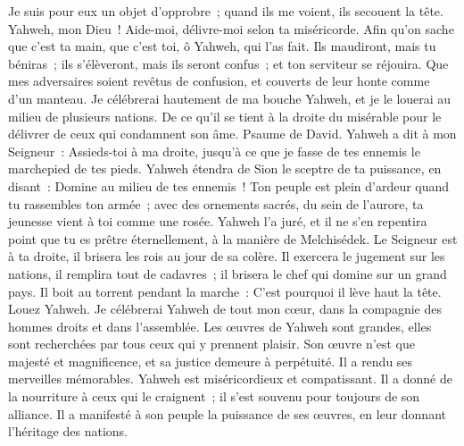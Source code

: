 \begin{multicols}{2}
Je suis pour eux un objet d'opprobre~; quand ils me voient, ils secouent la tête.
Yahweh, mon Dieu~! Aide-moi, délivre-moi selon ta miséricorde.
Afin qu'on sache que c'est ta main, que c'est toi, ô Yahweh, qui l'as fait.
Ils maudiront, mais tu béniras~; ils s'élèveront, mais ils seront confus~; et ton serviteur se réjouira.
Que mes adversaires soient revêtus de confusion, et couverts de leur honte comme d'un manteau.
Je célébrerai hautement de ma bouche Yahweh, et je le louerai au milieu de plusieurs nations.
De ce qu'il se tient à la droite du misérable pour le délivrer de ceux qui condamnent son âme.
\VerseOne{}Psaume de David. Yahweh a dit à mon Seigneur~: Assieds-toi à ma droite, jusqu'à ce que je fasse de tes ennemis le marchepied de tes pieds.
Yahweh étendra de Sion le sceptre de ta puissance, en disant~: Domine au milieu de tes ennemis~!
Ton peuple est plein d'ardeur quand tu rassembles ton armée~; avec des ornements sacrés, du sein de l'aurore, ta jeunesse vient à toi comme une rosée.
Yahweh l'a juré, et il ne s'en repentira point que tu es prêtre éternellement, à la manière de Melchisédek.
Le Seigneur est à ta droite, il brisera les rois au jour de sa colère.
Il exercera le jugement sur les nations, il remplira tout de cadavres~; il brisera le chef qui domine sur un grand pays.
Il boit au torrent pendant la marche~: C'est pourquoi il lève haut la tête.
\VerseOne{}Louez Yahweh.  Je célébrerai Yahweh de tout mon cœur,  dans la compagnie des hommes droits et dans l'assemblée.
 Les œuvres de Yahweh sont grandes,  elles sont recherchées par tous ceux qui y prennent plaisir.
 Son œuvre n'est que majesté et magnificence,  et sa justice demeure à perpétuité.
 Il a rendu ses merveilles mémorables.  Yahweh est miséricordieux et compatissant.
 Il a donné de la nourriture à ceux qui le craignent~;  il s'est souvenu pour toujours de son alliance.
 Il a manifesté à son peuple la puissance de ses œuvres,  en leur donnant l'héritage des nations.

\end{multicols}
